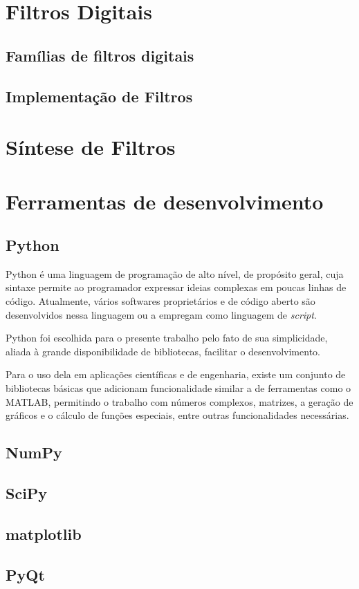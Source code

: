 \section{Filtros Digitais}
\subsection{Famílias de filtros digitais}

\subsection{Implementação de Filtros}

\section{Síntese de Filtros}

\section{Ferramentas de desenvolvimento}
\subsection{Python}

Python é uma linguagem de programação de alto nível, de propósito geral, cuja sintaxe permite ao programador expressar ideias complexas em poucas linhas de código. Atualmente, vários softwares proprietários e de código aberto são desenvolvidos nessa linguagem ou a empregam como linguagem de \textit{script}.

Python foi escolhida para o presente trabalho pelo fato de sua simplicidade, aliada à grande disponibilidade de bibliotecas, facilitar o desenvolvimento.

Para o uso dela em aplicações científicas e de engenharia, existe um conjunto de bibliotecas básicas que adicionam funcionalidade similar a de ferramentas como o MATLAB, permitindo o trabalho com números complexos, matrizes, a geração de gráficos e o cálculo de funções especiais, entre outras funcionalidades necessárias.

\subsection{NumPy}
\subsection{SciPy}
\subsection{matplotlib}
\subsection{PyQt}
